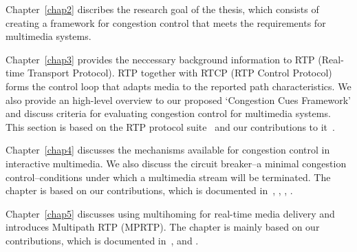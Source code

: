 Chapter~\ref{chap2} discribes the research goal of the thesis, which consists
of creating a framework for congestion control that meets the requirements for
multimedia systems.


Chapter~\ref{chap3} provides the neccessary background information to RTP
(Real-time Transport Protocol). RTP together with RTCP (RTP Control Protocol)
forms the control loop that adapts media to the reported path characteristics.
We also provide an high-level overview to our proposed `Congestion Cues
Framework' and discuss criteria for evaluating congestion control for
multimedia systems. This section is based on the RTP protocol
suite~\cite{rfc3550, rfc4585, rfc3611, rfc5104, rfc5506} and our contributions
to it~\cite{draft.rmcat.evaluate, draft.xr.discard.rle, draft.xr.jb}.


Chapter~\ref{chap4} discusses the mechanisms available for congestion control
in interactive multimedia. We also discuss the circuit breaker--a minimal
congestion control--conditions under which a multimedia stream will be
terminated. The chapter is based on our contributions, which is documented
in~\cite{draft.rtp.cb, Singh:control.loops.api}, ,
, .


Chapter~\ref{chap5} discusses using multihoming for real-time media delivery
and introduces Multipath RTP (MPRTP). The chapter is mainly based on our
contributions, which is documented in~\cite{draft.mprtp, draft.mprtp.sdp,
Globisch:AsymGrpComm, draft.rtcp.overlay}, and .


